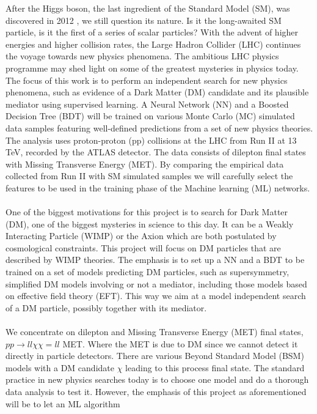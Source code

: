 \documentclass[12pt, a4paper]{book}
\begin{document}
After the Higgs boson, the last ingredient of the Standard Model (SM), was discovered in 2012 \cite{Higgs_discovery_2012}, we still question its nature. Is it the long-awaited SM particle, is it the first of a series of scalar particles? 
With the advent of higher energies and higher collision rates, the Large Hadron Collider (LHC) continues the voyage towards new physics phenomena. The ambitious LHC physics programme may shed light on some of the greatest mysteries in physics today. 
The focus of this work is to perform an independent search for new physics phenomena, such as evidence of a Dark Matter (DM) candidate and its plausible mediator using supervised learning. A Neural Network (NN) and a Boosted Decision Tree (BDT) will 
be trained on various Monte Carlo (MC) simulated data samples featuring well-defined predictions from a set of new physics theories. The analysis uses proton-proton (pp) collisions at the LHC from Run II at 13 TeV, recorded by the ATLAS detector. 
The data consists of dilepton final states with Missing Transverse Energy (MET). By comparing the empirical data collected from Run II with SM simulated samples we will carefully select the features to be used in the training phase of the Machine learning 
(ML) networks. \\
\\ One of the biggest motivations for this project is to search for Dark Matter (DM), one of the biggest mysteries in science to this day. It can be a Weakly Interacting Particle (WIMP) \cite{WIMP} or the Axion \cite{Axion} which are both postulated by cosmological constraints. 
This project will focus on DM particles that are described by WIMP theories. The emphasis is to set up a NN and a BDT to be trained on a set of models predicting DM particles, such as supersymmetry, simplified DM models involving or not a mediator, including those 
models based on effective field theory (EFT). This way we aim at a model independent search of a DM particle, possibly together with its mediator.\\
\\ We concentrate on dilepton and Missing Transverse Energy (MET) final states, $pp\rightarrow ll \chi\chi = ll$ MET. Where the MET is due to DM since we cannot detect it directly in particle detectors. There are various Beyond Standard Model (BSM) models 
with a DM candidate $\chi$ leading to this process final state. The standard practice in new physics searches today is to choose one model and do a thorough data analysis to test it. However, the emphasis of this project as aforementioned will be to let an ML algorithm 
\end{document}
